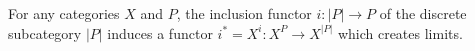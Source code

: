 For any categories $X$ and $P$, the inclusion functor $i: |P| \rightarrow P$ of the discrete subcategory $|P|$ induces a functor $i^* = X^i: X^P \rightarrow X^{|P|}$ which creates limits.